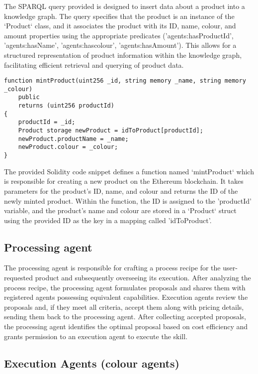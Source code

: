 \begin{bibunit}
The SPARQL query provided is designed to insert data about a product into a knowledge graph. The query specifies that the product is an instance of the `Product` class, and it associates the product with its ID, name, colour, and amount properties using the appropriate predicates ('agents:hasProductId', 'agents:hasName', 'agents:hascolour', 'agents:hasAmount'). This allows for a structured representation of product information within the knowledge graph, facilitating efficient retrieval and querying of product data.

\begin{lstlisting} 
function mintProduct(uint256 _id, string memory _name, string memory _colour)
    public
    returns (uint256 productId)
{
    productId = _id;
    Product storage newProduct = idToProduct[productId];
    newProduct.productName = _name;
    newProduct.colour = _colour;
}
\end{lstlisting}
The provided Solidity code snippet defines a function named `mintProduct` which is responsible for creating a new product on the Ethereum blockchain. It takes parameters for the product's ID, name, and colour and returns the ID of the newly minted product. Within the function, the ID is assigned to the 'productId' variable, and the product's name and colour are stored in a `Product` struct using the provided ID as the key in a mapping called 'idToProduct'.

\subsection{Processing agent} 

The processing agent is responsible for crafting a process recipe for the user-requested product and subsequently overseeing its execution. After analyzing the process recipe, the processing agent formulates proposals and shares them with registered agents possessing equivalent capabilities. Execution agents review the proposals and, if they meet all criteria, accept them along with pricing details, sending them back to the processing agent. After collecting accepted proposals, the processing agent identifies the optimal proposal based on cost efficiency and grants permission to an execution agent to execute the skill.

\subsection{Execution Agents (colour agents)}


\end{bibunit}
